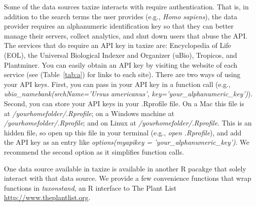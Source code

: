 \documentclass[letterpaper,superscriptaddress,showkeys,longbibliography,10pt]{revtex4-1}\usepackage{graphicx, color}
\begin{document}
Some of the data sources taxize interacts with require authentication. That is, in addition to the search terms the user provides (e.g., \emph{Homo sapiens}), the data provider requires an alphanumeric identification key so that they can better manage their servers, collect analytics, and shut down users that abuse the API. The services that do require an API key in taxize are: Encyclopedia of Life (EOL), the Universal Biological Indexer and Organizer (uBio), Tropicos, and Plantminer. You can easily obtain an API key by visiting the website of each service (see (Table~\ref{tab:a}) for links to each site). There are two ways of using your API keys. First, you can pass in your API key in a function call (e.g., \emph{ubio\_namebank(srchName='Ursus americanus', key='your\_alphanumeric\_key')}). Second, you can store your API keys in your .Rprofile file. On a Mac this file is at \emph{/yourhomefolder/.Rprofile}; on a Windows machine at \emph{/yourhomefolder/.Rprofile}; and on Linux at \emph{/yourhomefolder/.Rprofile}. This is an hidden file, so open up this file in your terminal (e.g., \emph{open .Rprofile}), and add the API key as an entry like \emph{options(myapikey = 'your\_alphanumeric\_key')}. We recommend the second option as it simplifies function calls. 

One data source available in taxize is available in another R pacakge that solely interact with that data source. We provide a few convenience functions that wrap functions in \emph{taxonstand}, an R interface to The Plant List \url{http://www.theplantlist.org}. 
\end{document}
